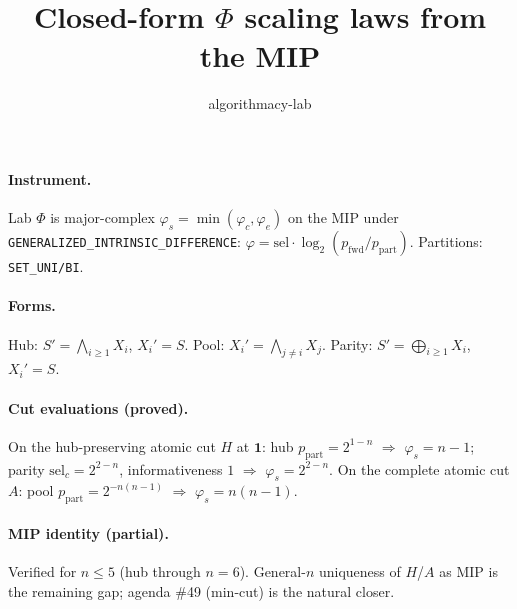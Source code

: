 \documentclass{article}
\title{Closed-form $\Phi$ scaling laws from the MIP}
\author{algorithmacy-lab}
\begin{document}
\maketitle

\paragraph{Instrument.}
Lab $\Phi$ is major-complex $\varphi_s=\min(\varphi_c,\varphi_e)$ on the
MIP under \texttt{GENERALIZED\_INTRINSIC\_DIFFERENCE}:
$\varphi=\mathrm{sel}\cdot\log_2(p_{\mathrm{fwd}}/p_{\mathrm{part}})$.
Partitions: \texttt{SET\_UNI/BI}.

\paragraph{Forms.}
Hub: $S'=\bigwedge_{i\ge1}X_i$, $X_i'=S$.
Pool: $X_i'=\bigwedge_{j\neq i}X_j$.
Parity: $S'=\bigoplus_{i\ge1}X_i$, $X_i'=S$.

\paragraph{Cut evaluations (proved).}
On the hub-preserving atomic cut $H$ at $\mathbf{1}$:
hub $p_{\mathrm{part}}=2^{1-n}$ $\Rightarrow$ $\varphi_s=n-1$;
parity $\mathrm{sel}_c=2^{2-n}$, informativeness $1$ $\Rightarrow$
$\varphi_s=2^{2-n}$.
On the complete atomic cut $A$: pool
$p_{\mathrm{part}}=2^{-n(n-1)}$ $\Rightarrow$ $\varphi_s=n(n-1)$.

\paragraph{MIP identity (partial).}
Verified for $n\le5$ (hub through $n=6$). General-$n$ uniqueness of
$H$/$A$ as MIP is the remaining gap; agenda \#49 (min-cut) is the
natural closer.
\end{document}
